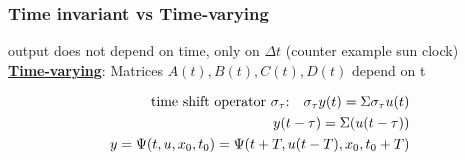     \subsubsection*{Time invariant vs Time-varying}
        output does not depend on time, only on $\Delta t$ (counter example sun clock)\\
        {\centering\textbf{\underline{Time-varying}}}: Matrices $A(t), B(t), C(t), D(t)$ depend on t

        \begin{align*}
            \text{time shift operator $\sigma_{\tau}$:\quad } \sigma_{\tau} y(t) = \Sigma \sigma_{\tau} u(t)\\
            y(t - \tau) = \Sigma(u(t - \tau))\\
            y = \Psi(t, u, x_0, t_0) = \Psi(t+T, u(t-T), x_0, t_0 + T)
        \end{align*}
